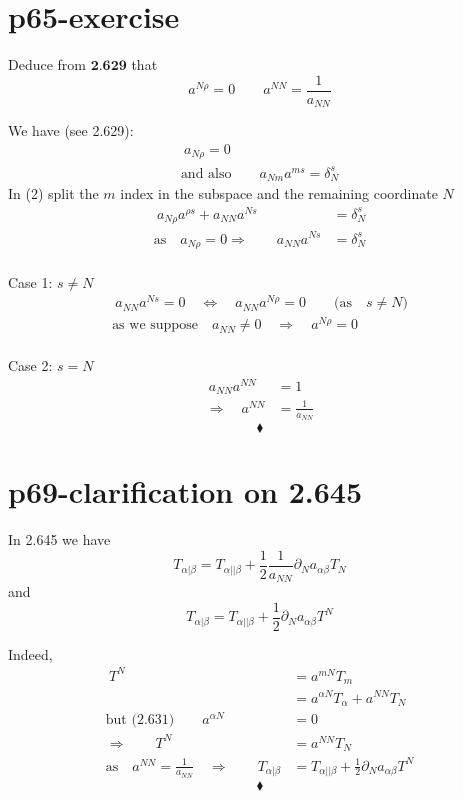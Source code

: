 \section{p65-exercise}
\begin{tcolorbox}
Deduce from $\textbf{2.629}$ that $$a^{N \rho} = 0  \quad\quad a^{NN} = \frac{1}{a_{NN}}$$
\end{tcolorbox}
We have (see 2.629):
\begin{align}
\ a_{N\rho} =0\\
\text{and also}\quad\quad a_{Nm}a^{ms} = \delta^s_N
\end{align}
In (2) split the $m$ index in the subspace and the remaining coordinate $N$
\begin{align}
\ a_{N\rho}a^{\rho s} +  a_{NN}a^{N s} &= \delta^s_N\\
\text{as}\quad a_{N\rho} =0 \Rightarrow \quad\quad a_{NN}a^{N s} &= \delta^s_N
\end{align}\\
Case 1: $s\ne N$
\begin{align}
\  a_{NN}a^{N s} =0 \quad \Leftrightarrow \quad a_{NN}a^{N \rho} =0 \quad\quad \text{(as}\quad s\ne N \text{)}\\
\text{as we suppose}\quad a_{NN}\ne 0 \quad \Rightarrow \quad a^{N \rho} =0
\end{align}\\

Case 2: $s= N$
\begin{align}
\  a_{NN}a^{N N} &=1 \\
\Rightarrow \quad a^{N N} &=\frac{1}{a_{NN}}
\end{align}
$$\blacklozenge$$
\newpage


\section{p69-clarification on 2.645}
\begin{tcolorbox}
In 2.645 we have $$T_{\alpha | \beta} =T_{\alpha || \beta}  +\frac{1}{2}\frac{1}{a_{NN}}\partial_N  a_{\alpha\beta}T_{N}$$ and $$T_{\alpha | \beta} =T_{\alpha || \beta}  +\frac{1}{2}\partial_N  a_{\alpha\beta}T^{N}$$
\end{tcolorbox}
Indeed,
\begin{align}
\ T^N &= a^{mN}T_m\\
\ & = a^{\alpha N}T_{\alpha}+a^{N N}T_{N}\\
\text{but (2.631)}\quad\quad a^{\alpha N} &= 0\\
\Rightarrow \quad\quad T^N &= a^{NN} T_N\\
\text{as}\quad a^{NN}= \frac{1}{a_{NN}} \quad \Rightarrow \quad\quad  T_{\alpha | \beta} &= T_{\alpha || \beta}  + \frac{1}{2}\partial_N  a_{\alpha\beta}T^{N}
\end{align}
$$\blacklozenge$$
\newpage
